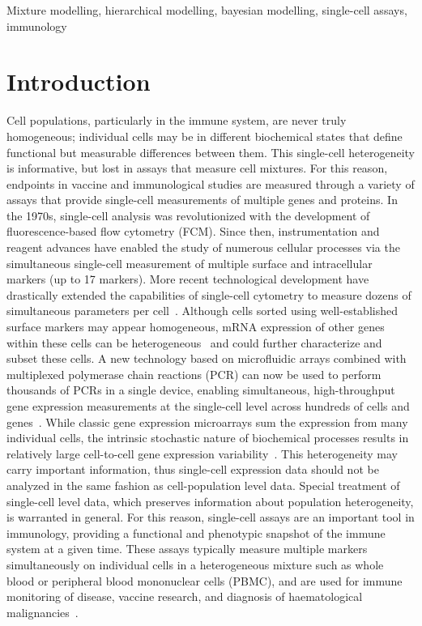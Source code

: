 \documentclass[useAMS,referee,usenatbib]{biom}
\begin{document}
\begin{keywords}
Mixture modelling, hierarchical modelling, bayesian modelling, single-cell assays, immunology
\end{keywords}

\maketitle

\section{Introduction}
\label{s:intro}
Cell populations, particularly in the immune system, are never truly homogeneous; individual cells may be in different biochemical states that define functional but measurable differences between them. 
This single-cell heterogeneity is informative, but lost in assays that measure cell mixtures. 
For this reason, endpoints in vaccine and immunological studies are measured through a variety of assays that provide single-cell measurements of multiple genes and proteins. 
In the 1970s, single-cell analysis was revolutionized with the development of fluorescence-based flow cytometry (FCM). 
Since then, instrumentation and reagent advances have enabled the study of numerous cellular processes via the simultaneous single-cell measurement of multiple surface and intracellular markers (up to 17 markers). 
More recent technological development have drastically extended the capabilities of single-cell cytometry to measure dozens of simultaneous parameters per cell~\citep{Bendall:2011wf}. 
Although cells sorted using well-established surface markers may appear homogeneous, mRNA expression of other genes within these cells can be heterogeneous~\citep{Narsinh:2011gn, Flatz:2011jb} and could further characterize and subset these cells. 
A new technology based on microfluidic arrays combined with multiplexed polymerase chain reactions (PCR) can now be used to perform thousands of PCRs in a single device, enabling simultaneous, high-throughput gene expression measurements at the single-cell level across hundreds of cells and genes~\citep{Pieprzyk:2009uc}. 
While classic gene expression microarrays sum the expression from many individual cells, the intrinsic stochastic nature of biochemical processes results in relatively large cell-to-cell gene expression variability~\citep{vanOudenaarden200915a}. 
This heterogeneity may carry important information, thus single-cell expression data should not be analyzed in the same fashion as cell-population level data. 
Special treatment of single-cell level data, which preserves information about population heterogeneity, is warranted in general. 
For this reason, single-cell assays are an important tool in immunology, providing a functional and phenotypic snapshot of the immune system at a given time. 
These assays typically measure multiple markers simultaneously on individual cells in a heterogeneous mixture such as whole blood or peripheral blood mononuclear cells  (PBMC), and are used for immune monitoring of disease, vaccine research, and diagnosis of haematological malignancies~\citep{Altman:1996wf,Betts:2006dw,Inokuma:2007tn}.
\end{document}
